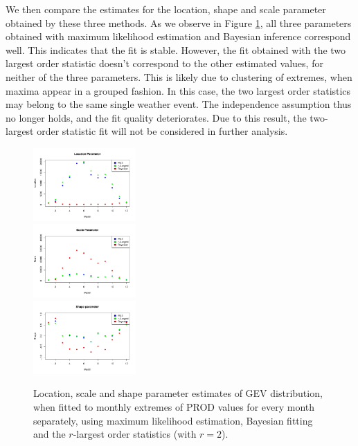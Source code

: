 \documentclass[10pt,conference,compsocconf]{IEEEtran}
\begin{document}
\par
We then compare the estimates for the location, shape and scale parameter obtained by these three methods. As we observe in Figure \ref{fig:params}, all three parameters obtained with maximum likelihood estimation and Bayesian inference correspond well. This indicates that the fit is stable. However, the fit obtained with the two largest order statistic doesn't correspond to the other estimated values, for neither of the three parameters. This is likely due to clustering of extremes, when maxima appear in a grouped fashion. In this case, the two largest order statistics may belong to the same single weather event. The independence assumption thus no longer holds, and the fit quality deteriorates. Due to this result, the two-largest order statistic fit will not be considered in further analysis.
\par
\begin{figure}
	\centering
	\includegraphics[width=0.35\textwidth]{../plots/evolution_eta.pdf}\\
	\includegraphics[width=0.35\textwidth]{../plots/evolution_tao.pdf}\\
	\includegraphics[width=0.35\textwidth]{../plots/evolution_xi.pdf}\\
	\caption{Location, scale and shape parameter estimates of GEV distribution, when fitted to monthly extremes of PROD values for every month separately, using maximum likelihood estimation, Bayesian fitting and the $r$-largest order statistics (with $r=2$).}
	\label{fig:params}
\end{figure}
\end{document}
